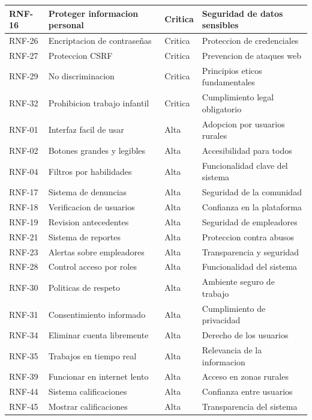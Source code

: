 \documentclass[12pt, a4paper]{article}
\begin{document}
\begin{itemize}
\begin{longtable}{|p{2cm}|p{6cm}|p{2cm}|p{4cm}|}
RNF-16 & Proteger informacion personal & Critica & Seguridad de datos sensibles \\
\hline
RNF-26 & Encriptacion de contraseñas & Critica & Proteccion de credenciales \\
\hline
RNF-27 & Proteccion CSRF & Critica & Prevencion de ataques web \\
\hline
RNF-29 & No discriminacion & Critica & Principios eticos fundamentales \\
\hline
RNF-32 & Prohibicion trabajo infantil & Critica & Cumplimiento legal obligatorio \\
\hline
RNF-01 & Interfaz facil de usar & Alta & Adopcion por usuarios rurales \\
\hline
RNF-02 & Botones grandes y legibles & Alta & Accesibilidad para todos \\
\hline
RNF-04 & Filtros por habilidades & Alta & Funcionalidad clave del sistema \\
\hline
RNF-17 & Sistema de denuncias & Alta & Seguridad de la comunidad \\
\hline
RNF-18 & Verificacion de usuarios & Alta & Confianza en la plataforma \\
\hline
RNF-19 & Revision antecedentes & Alta & Seguridad de empleadores \\
\hline
RNF-21 & Sistema de reportes & Alta & Proteccion contra abusos \\
\hline
RNF-23 & Alertas sobre empleadores & Alta & Transparencia y seguridad \\
\hline
RNF-28 & Control acceso por roles & Alta & Funcionalidad del sistema \\
\hline
RNF-30 & Politicas de respeto & Alta & Ambiente seguro de trabajo \\
\hline
RNF-31 & Consentimiento informado & Alta & Cumplimiento de privacidad \\
\hline
RNF-34 & Eliminar cuenta libremente & Alta & Derecho de los usuarios \\
\hline
RNF-35 & Trabajos en tiempo real & Alta & Relevancia de la informacion \\
\hline
RNF-39 & Funcionar en internet lento & Alta & Acceso en zonas rurales \\
\hline
RNF-44 & Sistema calificaciones & Alta & Confianza entre usuarios \\
\hline
RNF-45 & Mostrar calificaciones & Alta & Transparencia del sistema \\
\hline
\end{longtable}


\end{itemize}
\end{document}
